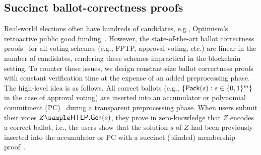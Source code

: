 

\subsection{Succinct ballot-correctness proofs}\label{sec:succinct_ballot_correctness}

Real-world elections often have hundreds of candidates, e.g., Optimism's retroactive public good funding~\cite{retropgf_voterguide}. However, the state-of-the-art ballot correctness proofs~\cite{C:BBCGI23,ACNS:Groth05} for all voting schemes (e.g., FPTP, approval voting, etc.) are linear in the number of candidates, rendering these schemes impractical in the blockchain setting. To counter these issues, we design constant-size ballot correctness proofs with constant verification time at the expense of an added preprocessing phase. The high-level idea is as follows. All correct ballots (e.g., $\{ \mathsf{Pack}(s) : s\in\{0,1\}^{m}\}$ in the case of approval voting) are inserted into an accumulator or polynomial commitment (PC)~\cite{AC:KatZavGol10} during a transparent preprocessing phase. When users submit their votes $Z \sample \htlp.\mathsf{Gen}(s)$, they prove in zero-knowledge that $Z$ encodes a correct ballot, i.e., the users show that the solution $s$ of $Z$ had been previously inserted into the accumulator or PC with a succinct (blinded) membership proof~\cite{CCS:ZBKMNS22}.


